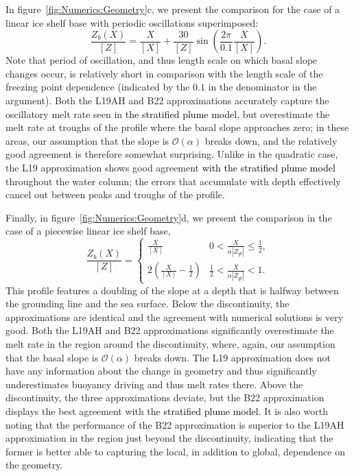 \documentclass[openacc]{rsproca_new}%
\newcommand{\order}[1]{\mathcal{O}(#1)}
\newcommand{\red}[1]{{\color{red} #1}}
\newcommand{\blue}[1]{{\color{blue} #1}}
\newcommand{\rout}[1]{\red{\st{#1}}}\newcommand{\ab}[1]{\textcolor{Green}{#1}}\newcommand{\about}[1]{\textcolor{Cyan}{\sout{#1}}}
\renewcommand{\rout}[1]{{}} %
\renewcommand{\blue}[1]{{\textcolor{black}{#1}}} %
\renewcommand{\red}[1]{{}} %
\begin{document}
In figure~\ref{fig:Numerics:Geometry}c, we present the comparison for the case of a linear ice shelf base with periodic oscillations superimposed:
\begin{equation}\label{E:Numerics:SinusoidalGeometry}
\frac{Z_b(X)}{\left[Z\right]}= \frac{X}{\left[X\right]} + \frac{30}{\left[Z\right]}\sin\left(\frac{2\pi}{0.1}\frac{ X}{\left[X\right]}\right).
\end{equation}
Note that period of oscillation, and thus length scale on which basal slope changes occur, is relatively short in comparison with the length scale of the freezing point dependence (indicated by the $0.1$ in the denominator in the argument). Both the L19AH and B22 approximations accurately capture the oscillatory melt rate seen in \blue{the stratified plume model}\rout{ numerical solutions}, but overestimate the melt rate at troughs of the profile where the basal slope approaches zero; in these areas, our assumption that the slope is $\order{\alpha}$ breaks down, and the relatively good agreement is therefore somewhat surprising. Unlike in the quadratic case, the L19 approximation shows good agreement \blue{with the stratified plume model} throughout the water column; the errors that accumulate with depth effectively cancel out between peaks and troughs of the profile.  

Finally, in figure~\ref{fig:Numerics:Geometry}d, we present the comparison in the case of a piecewise linear ice shelf base,
\begin{equation}\label{E:Numerics:PiecewiseGeometry}
\frac{Z_b(X)}{\left[Z\right]} = \begin{cases}
  \frac{X}{\left[X\right]}  & 0 <   \frac{X}{\alpha |Z_{gl}|} \leq   \frac{1}{2},\\
   2 \left(\frac{X}{\left[X\right]} -\frac{1}{2}\right)  &  \frac{1}{2} <   \frac{X}{\alpha |Z_{gl}|} <   1.
    \end{cases}
\end{equation}
This profile features a doubling of the slope at a depth that is halfway between the grounding line and the sea surface. Below the discontinuity, the approximations are identical and the agreement with numerical solutions is very good. Both the L19AH and B22 approximations significantly overestimate the melt rate in the region around the discontinuity, where, again, our assumption that the basal slope is $\order{\alpha}$ breaks down. The L19 approximation does not have any information about the change in geometry and thus significantly underestimates buoyancy driving and thus melt rates there. Above the discontinuity, the three approximations deviate, but the B22 approximation displays the best agreement with the \blue{stratified plume model}\rout{ numerical solution}. It is also worth noting that the performance of the B22 approximation is superior to the L19AH approximation in the region just beyond the discontinuity, indicating that the former is better able to capturing the local, in addition to global, dependence on the geometry.
\end{document}
